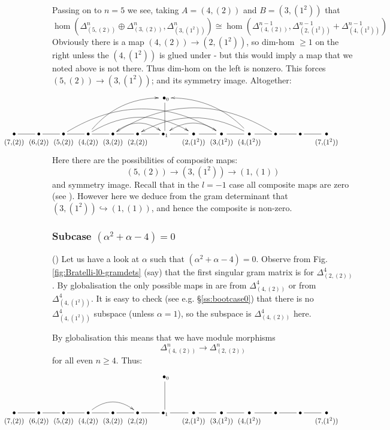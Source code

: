 \documentclass{article}
\theoremstyle{definition}
\newcommand{\beq}{\begin{equation}}
\newcommand{\eq}{\end{equation}}
\newcommand{\mdef}{\refstepcounter{theorem}       \medskip \noindent ({\bf \thetheorem}) }
\numberwithin{equation}{subsection}
\begin{document}
Passing on to $n=5$ we see, taking $A=(4,(2))$ and $B=(3,(1^2))$ that 
\[
\hom(\Delta^{n}_{(5,(2))} \oplus \Delta^{n}_{(3,(2))} , \Delta^{n}_{(3,(1^2))} ) 
 \cong  
\hom(\Delta^{n-1}_{(4,(2))} , \Delta^{n-1}_{(2,(1^2))} + \Delta^{n-1}_{(4,(1^2))}) 
\]
Obviously there is a map $(4,(2))\rightarrow (2,(1^2))$, so dim-hom $\geq 1$ on the right unless the $(4,(1^2))$ is glued under - but this would imply a map that we 
noted above  %
is not there. Thus dim-hom on the left is nonzero. This forces 
$(5,(2))\rightarrow (3,(1^2))$; and its symmetry image. 
Altogether: 
\[
\hspace{-2.1cm} 
\xymatrix{
   &&&&&& \;\bullet_0 \ar@{-}[d] \\
\ver{(7,\!(2))} \ar@{-}[r] & 
\ver{(6,\!(2))} \ar@{-}[r] & 
\ver{(5,\!(2))} \ar@{-}[r] \ar@[green]@/^2.963pc/[rrrrrr] & 
\ver{(4,\!(2))} \ar@{-}[r] \ar@[red]@/^1.3pc/[rrru] \ar@[red]@/^1.9863pc/[rrrr] & 
\ver{(3,\!(2))} \ar@{-}[r] \ar@[red]@/^1.3pc/[rr] & 
\ver{(2,\!(2))} \ar@{-}[r] & 
\bullet_1 \ar@{-}[r] & 
\ver{(2,\!(1^2))} \ar@{-}[r] & 
\ver{(3,\!(1^2))} \ar@{-}[r] \ar@[red]@/_1.3pc/[ll] & 
\ver{(4,\!(1^2))} \ar@{-}[r] \ar@[red]@/_1.3pc/[lllu] \ar@[red]@/_1.93pc/[llll] & 
\bullet \ar@{-}[r] \ar@[green]@/_3.093pc/[llllll] & 
\bullet \ar@{-}[r] & 
\ver{(7,\!(1^2))} & 
}
\] 
Here there are the possibilities of composite maps:
\[
(5,(2)) \rightarrow (3,(1^2)) \rightarrow (1,(1)) 
\]
and symmetry image. Recall that in the $l=-1$ case all composite maps are zero 
(see \cite[Ch.6]{Martin91}).  
However here we deduce from the gram determinant that 
$ (3,(1^2)) \hookrightarrow (1,(1)) $, and hence the composite is non-zero. 

\subsubsection{Subcase  $(\alpha^2 + \alpha -4)=0$}

\mdef  
Let us have a look at $\alpha$ such that $(\alpha^2 + \alpha -4)=0$. 
Observe from Fig.\ref{fig:Bratelli-l0-gramdets} (say) that 
the first singular gram matrix is for  $\Delta^{4}_{(2,(2))}$. 
By globalisation the only possible maps in are from 
$\Delta^{4}_{(4,(2))}$ or from $\Delta^{4}_{(4,(1^2))}$. 
It is easy to check 
(see e.g. \S\ref{ss:bootcase0})
that there is no  $\Delta^4_{(4,(1^2))}$ subspace
(unless $\alpha=1$), 
so the subspace is $\Delta^4_{(4,(2))}$ here. 

By globalisation this means that we have module morphisms 
\beq \label{eq:morphismto22} 
\Delta^n_{(4,(2))}  \rightarrow \Delta^n_{(2,(2))}
\eq 
for all even $n\geq 4$.
Thus:
\[
\hspace{-2.1cm} 
\xymatrix{
   &&&&&& \;\bullet_0 \ar@{-}[d] \\
\ver{(7,\!(2))} \ar@{-}[r] & 
\ver{(6,\!(2))} \ar@{-}[r] & 
\ver{(5,\!(2))} \ar@{-}[r] & 
\ver{(4,\!(2))} \ar@{-}[r] \ar@[red]@/^1.3pc/[rr] & 
\ver{(3,\!(2))} \ar@{-}[r] & 
\ver{(2,\!(2))} \ar@{-}[r] & 
\bullet_1 \ar@{-}[r] & 
\ver{(2,\!(1^2))} \ar@{-}[r] & 
\ver{(3,\!(1^2))} \ar@{-}[r] & 
\ver{(4,\!(1^2))} \ar@{-}[r] & 
\bullet \ar@{-}[r] & 
\bullet \ar@{-}[r] & 
\ver{(7,\!(1^2))} & 
}
\]
\end{document}
